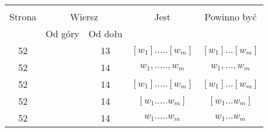\documentclass[a4paper,11pt]{article}
\begin{document}
\begin{center}
  \begin{tabular}{|c|c|c|c|c|}
    \hline
    & \multicolumn{2}{c|}{} & & \\
    Strona & \multicolumn{2}{c|}{Wiersz} & Jest
                              & Powinno być \\ \cline{2-3}
    & Od góry & Od dołu & & \\
    \hline
    52  & & 13 & $[ w_{ 1 } ].....[ w_{ m } ]$ & $[ w_{ 1 } ] \ldots [ w_{ m } ]$ \\
    52  & & 14 & $w_{ 1 }, ....., w_{ m }$ & $w_{ 1 }, \ldots, w_{ m }$ \\
    52  & & 14 & $[ w_{ 1 } ].....[ w_{ m } ]$
           & $[ w_{ 1 } ] \ldots [ w_{ m } ]$ \\
    52  & & 14 & $[ w_{ 1 } ..... w_{ m } ]$ & $[ w_{ 1 } \ldots w_{ m } ]$ \\
    52  & & 14 & $w_{ 1 } ..... w_{ m }$ & $w_{ 1 } \ldots w_{ m }$ \\
    \hline
  \end{tabular}

\end{center}
\end{document}
